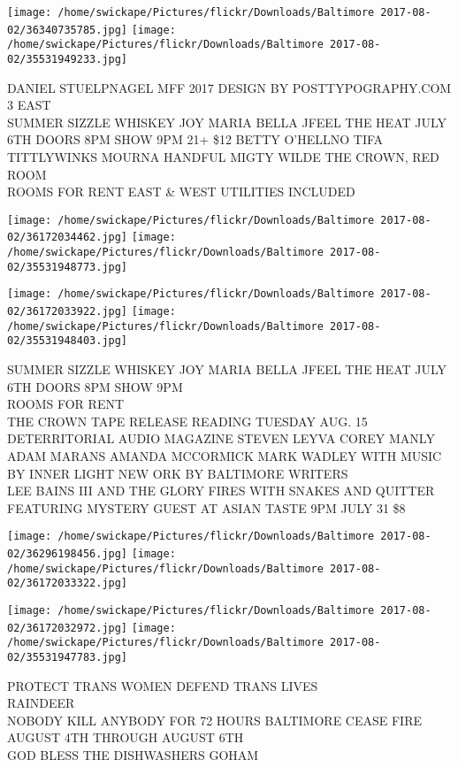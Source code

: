 \documentclass[10pt,letterpaper]{article}
\begin{document}
\texttt{[image: /home/swickape/Pictures/flickr/Downloads/Baltimore 2017-08-02/36340735785.jpg]}
\texttt{[image: /home/swickape/Pictures/flickr/Downloads/Baltimore 2017-08-02/35531949233.jpg]}

DANIEL STUELPNAGEL MFF 2017 DESIGN BY POSTTYPOGRAPHY.COM\\
3 EAST\\
SUMMER SIZZLE WHISKEY JOY MARIA BELLA JFEEL THE HEAT JULY 6TH DOORS 8PM SHOW 9PM 21+ \$12 BETTY O'HELLNO TIFA TITTLYWINKS MOURNA HANDFUL MIGTY WILDE THE CROWN, RED ROOM\\
ROOMS FOR RENT EAST \& WEST UTILITIES INCLUDED
\pagebreak

\texttt{[image: /home/swickape/Pictures/flickr/Downloads/Baltimore 2017-08-02/36172034462.jpg]}
\texttt{[image: /home/swickape/Pictures/flickr/Downloads/Baltimore 2017-08-02/35531948773.jpg]}

\texttt{[image: /home/swickape/Pictures/flickr/Downloads/Baltimore 2017-08-02/36172033922.jpg]}
\texttt{[image: /home/swickape/Pictures/flickr/Downloads/Baltimore 2017-08-02/35531948403.jpg]}

SUMMER SIZZLE WHISKEY JOY MARIA BELLA JFEEL THE HEAT JULY 6TH DOORS 8PM SHOW 9PM\\
ROOMS FOR RENT\\
THE CROWN TAPE RELEASE READING TUESDAY AUG. 15 DETERRITORIAL AUDIO MAGAZINE STEVEN LEYVA COREY MANLY ADAM MARANS AMANDA MCCORMICK MARK WADLEY WITH MUSIC BY INNER LIGHT NEW ORK BY BALTIMORE WRITERS\\
LEE BAINS III AND THE GLORY FIRES WITH SNAKES AND QUITTER FEATURING MYSTERY GUEST AT ASIAN TASTE 9PM JULY 31 \$8
\pagebreak

\texttt{[image: /home/swickape/Pictures/flickr/Downloads/Baltimore 2017-08-02/36296198456.jpg]}
\texttt{[image: /home/swickape/Pictures/flickr/Downloads/Baltimore 2017-08-02/36172033322.jpg]}

\texttt{[image: /home/swickape/Pictures/flickr/Downloads/Baltimore 2017-08-02/36172032972.jpg]}
\texttt{[image: /home/swickape/Pictures/flickr/Downloads/Baltimore 2017-08-02/35531947783.jpg]}

PROTECT TRANS WOMEN DEFEND TRANS LIVES\\
RAINDEER\\
NOBODY KILL ANYBODY FOR 72 HOURS BALTIMORE CEASE FIRE AUGUST 4TH THROUGH AUGUST 6TH\\
GOD BLESS THE DISHWASHERS GOHAM
\pagebreak
\end{document}
